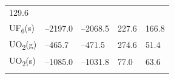\documentclass[
]{book}
\theoremstyle{definition}
\theoremstyle{definition}
\theoremstyle{definition}
\theoremstyle{remark}
\begin{document}
\begin{longtable}[]{@{}lllll@{}}
\begin{minipage}[t]{0.18\columnwidth}
129.6\strut
\end{minipage}\tabularnewline
\begin{minipage}[t]{0.10\columnwidth}\raggedright
UF\textsubscript{6}(s)\strut
\end{minipage} & \begin{minipage}[t]{0.19\columnwidth}\raggedright
--2197.0\strut
\end{minipage} & \begin{minipage}[t]{0.20\columnwidth}\raggedright
--2068.5\strut
\end{minipage} & \begin{minipage}[t]{0.18\columnwidth}\raggedright
227.6\strut
\end{minipage} & \begin{minipage}[t]{0.18\columnwidth}\raggedright
166.8\strut
\end{minipage}\tabularnewline
\begin{minipage}[t]{0.10\columnwidth}\raggedright
UO\textsubscript{2}(g)\strut
\end{minipage} & \begin{minipage}[t]{0.19\columnwidth}\raggedright
--465.7\strut
\end{minipage} & \begin{minipage}[t]{0.20\columnwidth}\raggedright
--471.5\strut
\end{minipage} & \begin{minipage}[t]{0.18\columnwidth}\raggedright
274.6\strut
\end{minipage} & \begin{minipage}[t]{0.18\columnwidth}\raggedright
51.4\strut
\end{minipage}\tabularnewline
\begin{minipage}[t]{0.10\columnwidth}\raggedright
UO\textsubscript{2}(s)\strut
\end{minipage} & \begin{minipage}[t]{0.19\columnwidth}\raggedright
--1085.0\strut
\end{minipage} & \begin{minipage}[t]{0.20\columnwidth}\raggedright
--1031.8\strut
\end{minipage} & \begin{minipage}[t]{0.18\columnwidth}\raggedright
77.0\strut
\end{minipage} & \begin{minipage}[t]{0.18\columnwidth}\raggedright
63.6\strut
\end{minipage}\tabularnewline
\begin{minipage}[t]{0.10\columnwidth}\raggedright

\end{minipage}
\end{longtable}
\end{document}
